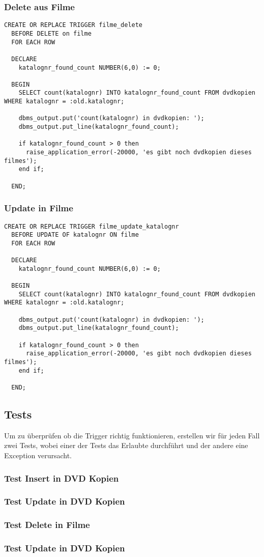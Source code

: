 \documentclass[11pt,a4paper,parskip=half]{scrartcl}
\begin{document}
\subsubsection{Delete aus Filme}
\begin{lstlisting}
CREATE OR REPLACE TRIGGER filme_delete
  BEFORE DELETE on filme
  FOR EACH ROW
  
  DECLARE
    katalognr_found_count NUMBER(6,0) := 0;
    
  BEGIN
    SELECT count(katalognr) INTO katalognr_found_count FROM dvdkopien WHERE katalognr = :old.katalognr;
    
    dbms_output.put('count(katalognr) in dvdkopien: ');
    dbms_output.put_line(katalognr_found_count);
    
    if katalognr_found_count > 0 then
      raise_application_error(-20000, 'es gibt noch dvdkopien dieses filmes');
    end if;
    
  END;
\end{lstlisting}

\subsubsection{Update in Filme}
\begin{lstlisting}
CREATE OR REPLACE TRIGGER filme_update_katalognr
  BEFORE UPDATE OF katalognr ON filme
  FOR EACH ROW
  
  DECLARE
    katalognr_found_count NUMBER(6,0) := 0;
    
  BEGIN
    SELECT count(katalognr) INTO katalognr_found_count FROM dvdkopien WHERE katalognr = :old.katalognr;
    
    dbms_output.put('count(katalognr) in dvdkopien: ');
    dbms_output.put_line(katalognr_found_count);
    
    if katalognr_found_count > 0 then
      raise_application_error(-20000, 'es gibt noch dvdkopien dieses filmes');
    end if;
    
  END;
\end{lstlisting}

\subsection{Tests}
Um zu überprüfen ob die Trigger richtig funktionieren, erstellen wir für jeden Fall zwei Tests, wobei einer der Tests das Erlaubte durchführt und der andere eine Exception verursacht.

\subsubsection{Test Insert in DVD Kopien}


\subsubsection{Test Update in DVD Kopien}


\subsubsection{Test Delete in Filme}


\subsubsection{Test Update in DVD Kopien}
\end{document}
